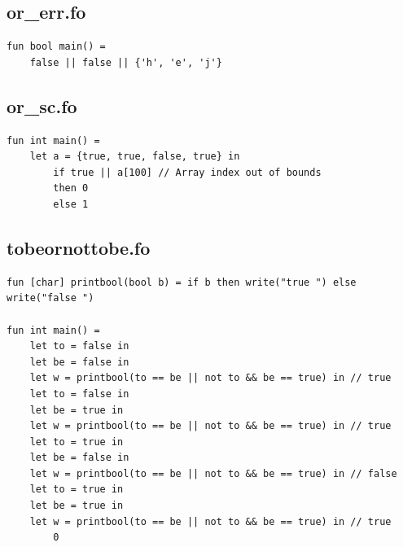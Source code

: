 \documentclass[11pt]{article}
\begin{document}
    \subsection{or\_err.fo}
    \begin{lstlisting}
fun bool main() =
    false || false || {'h', 'e', 'j'}
    \end{lstlisting}

    \subsection{or\_sc.fo}
    \begin{lstlisting}
fun int main() =
    let a = {true, true, false, true} in
        if true || a[100] // Array index out of bounds
        then 0
        else 1
    \end{lstlisting}

    \subsection{tobeornottobe.fo}
    \begin{lstlisting}
fun [char] printbool(bool b) = if b then write("true ") else write("false ")

fun int main() =
    let to = false in
    let be = false in
    let w = printbool(to == be || not to && be == true) in // true
    let to = false in
    let be = true in
    let w = printbool(to == be || not to && be == true) in // true
    let to = true in
    let be = false in
    let w = printbool(to == be || not to && be == true) in // false
    let to = true in
    let be = true in
    let w = printbool(to == be || not to && be == true) in // true
        0
    \end{lstlisting}

    \newpage
\end{document}
